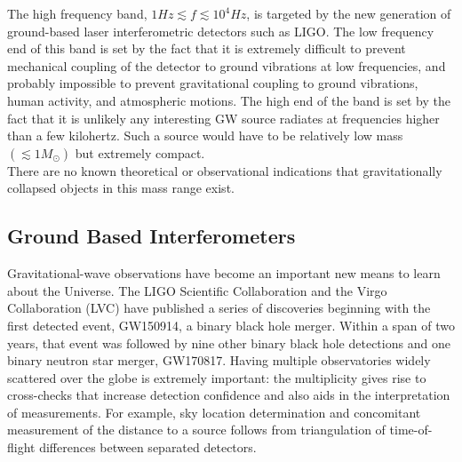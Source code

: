 \documentclass[binding=0.6cm, LaM]{sapthesis}
\begin{document}
	The high frequency band, $1Hz \apprle f \apprle 10^4 Hz$, is targeted by 
	the new generation of ground-based laser interferometric detectors such as LIGO.
	The low frequency end of this band is set by the fact that it is extremely difficult 
	to prevent mechanical coupling of the detector to ground vibrations at low frequencies,
	and probably impossible to prevent gravitational coupling to ground vibrations, human activity, and atmospheric motions.
	The high end of the band is set by the fact that it is unlikely any interesting GW source 
	radiates at frequencies higher than a few kilohertz. Such a source would have to be relatively
	low mass $(\apprle 1M_{\odot})$ but extremely compact. \\
	There are no known theoretical or observational indications that gravitationally collapsed objects in this mass range exist.

\subsection{Ground Based Interferometers}

	Gravitational-wave observations have become an important new means to learn about the Universe. 
	The LIGO Scientific Collaboration and the Virgo Collaboration (LVC) have published a series 
	of discoveries beginning with the first detected event, GW150914, a binary black hole merger. 
	Within a span of two years, that event was followed by nine other binary black hole detections
	and one binary neutron star merger, GW170817. 
	Having multiple observatories widely scattered over the globe is extremely important: 
	the multiplicity gives rise to cross-checks that increase detection confidence and also 
	aids in the interpretation of measurements. 
	For example, sky location determination and concomitant measurement of the distance 
	to a source follows from triangulation of time-of-flight differences between separated detectors.
\end{document}
